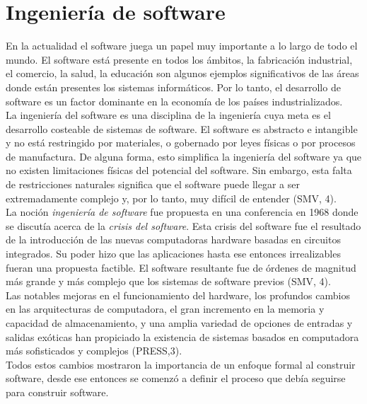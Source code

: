 \section{Ingeniería de software}
En la actualidad el software juega un papel muy importante a lo largo de todo el mundo. El software está presente en todos los ámbitos,
la fabricación industrial, el comercio, la salud, la educación son algunos ejemplos significativos de las áreas donde están presentes los 
sistemas informáticos. Por lo tanto, el desarrollo de software es un factor dominante en la economía de los países industrializados.\\

La ingeniería del software es una disciplina de la ingeniería cuya meta es el desarrollo costeable de sistemas de software. El software es
abstracto e intangible y no está restringido por materiales, o gobernado por leyes físicas o por procesos de manufactura. De alguna forma, esto
simplifica la ingeniería del software ya que no existen limitaciones físicas del potencial del software. 
Sin embargo, esta falta de restricciones naturales significa que el software puede llegar a ser extremadamente complejo y, por lo tanto, muy difícil de entender (SMV, 4).\\

La noción \emph{ingeniería de software} fue propuesta en una conferencia en 1968 donde se discutía acerca de la \emph{crisis del software}. Esta crisis del software
fue el resultado de la introducción de las nuevas computadoras hardware basadas en circuitos integrados. Su poder hizo que las aplicaciones
hasta ese entonces irrealizables fueran una propuesta factible. El software resultante fue de órdenes de magnitud más grande y más
complejo que los sistemas de software previos (SMV, 4).\\

Las notables mejoras en el funcionamiento del hardware, los profundos cambios en las arquitecturas de computadora, 
el gran incremento en la memoria y capacidad de almacenamiento, y
una amplia variedad de opciones de entradas y salidas exóticas han propiciado la existencia de
sistemas basados en computadora más sofisticados y complejos (PRESS,3).\\

Todos estos cambios mostraron la importancia de un enfoque formal al construir software, desde ese entonces 
se comenzó a definir el proceso que debía seguirse para construir software.\\

